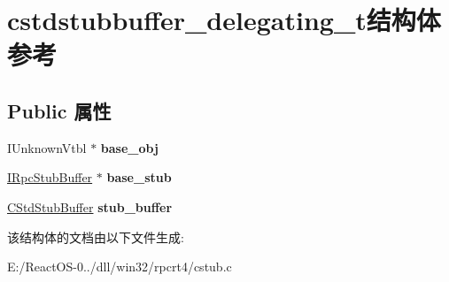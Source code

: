 \hypertarget{structcstdstubbuffer__delegating__t}{}\section{cstdstubbuffer\+\_\+delegating\+\_\+t结构体 参考}
\label{structcstdstubbuffer__delegating__t}
\subsection*{Public 属性}
\begin{DoxyCompactItemize}
\item 
\mbox{\label{structcstdstubbuffer__delegating__t_a8e900f54f4a4144f15bd2cf99c09afae}} 
I\+Unknown\+Vtbl $\ast$ {\bfseries base\+\_\+obj}
\item 
\mbox{\label{structcstdstubbuffer__delegating__t_ad8f192430d728daaf26b1deb30566724}} 
\hyperlink{interface_i_rpc_stub_buffer}{I\+Rpc\+Stub\+Buffer} $\ast$ {\bfseries base\+\_\+stub}
\item 
\mbox{\label{structcstdstubbuffer__delegating__t_aa05698abbe9380d31f0eb1fbb4f89b34}} 
\hyperlink{structtag_c_std_stub_buffer}{C\+Std\+Stub\+Buffer} {\bfseries stub\+\_\+buffer}
\end{DoxyCompactItemize}


该结构体的文档由以下文件生成\+:\begin{DoxyCompactItemize}
\item 
E\+:/\+React\+O\+S-\/0../dll/win32/rpcrt4/cstub.\+c\end{DoxyCompactItemize}
